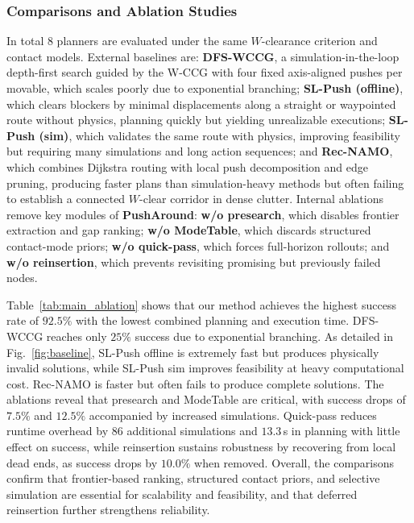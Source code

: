 \subsubsection{Comparisons and Ablation Studies}\label{subsec:comparisons}
In total $8$ planners are evaluated under the same $W$-clearance criterion and contact models. External
baselines are: \textbf{DFS-WCCG}, a simulation-in-the-loop depth-first search guided by the W-CCG
with four fixed axis-aligned pushes per movable, which scales poorly due to exponential branching;
\textbf{SL-Push (offline)}, which clears blockers by minimal displacements along a straight or
waypointed route without physics, planning quickly but yielding unrealizable executions;
\textbf{SL-Push (sim)}, which validates the same route with physics, improving feasibility but
requiring many simulations and long action sequences; and \textbf{Rec-NAMO}, which combines Dijkstra
routing with local push decomposition and edge pruning, producing faster plans than simulation-heavy
methods but often failing to establish a connected $W$-clear corridor in dense clutter. Internal
ablations remove key modules of \textbf{PushAround}: \textbf{w/o presearch}, which disables frontier extraction and
gap ranking; \textbf{w/o ModeTable}, which discards structured contact-mode priors; \textbf{w/o
quick-pass}, which forces full-horizon rollouts; and \textbf{w/o reinsertion}, which prevents
revisiting promising but previously failed nodes.

Table~\ref{tab:main_ablation} shows that our method achieves the highest success rate of $92.5\%$
with the lowest combined planning and execution time. DFS-WCCG reaches only $25\%$ success due to
exponential branching.
As detailed in Fig.~\ref{fig:baseline},
SL-Push offline is extremely fast but produces physically invalid solutions,
while SL-Push sim improves feasibility at heavy computational cost. Rec-NAMO is faster but often
fails to produce complete solutions. The ablations reveal that presearch and ModeTable are critical,
with success drops of $7.5\%$ and $12.5\%$ accompanied by increased simulations. Quick-pass reduces
runtime overhead by $86$ additional simulations and $13.3$\,s in planning with little effect on
success, while reinsertion sustains robustness by recovering from local dead ends, as success drops
by $10.0\%$ when removed. Overall, the comparisons confirm that frontier-based ranking, structured
contact priors, and selective simulation are essential for scalability and feasibility, and that
deferred reinsertion further strengthens reliability.


